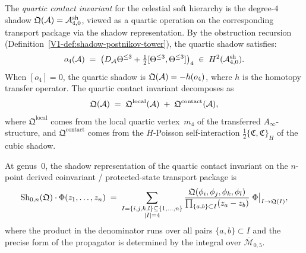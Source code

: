 \begin{definition}
The \emph{quartic contact invariant} for the celestial soft
hierarchy is the degree-$4$ shadow
$\mathfrak{Q}(\mathcal{A}) = \mathcal{A}^{\mathrm{sh}}_{4,0}$, viewed as a
quartic operation on the corresponding transport package via the shadow
representation. By the obstruction recursion
(Definition~\ref{V1-def:shadow-postnikov-tower}), the quartic
shadow satisfies:
\begin{equation}%
o_4(\cA)
\;=\;
\bigl(D_\cA\Theta^{\leq 3} + \tfrac{1}{2}
[\Theta^{\leq 3}, \Theta^{\leq 3}]\bigr)_4
\;\in\;
H^2(\cA^{\mathrm{sh}}_{4,0}).
\end{equation}
When $[o_4] = 0$, the quartic shadow is
$\mathfrak{Q}(\mathcal{A}) = -h(o_4)$, where $h$ is the homotopy transfer
operator. The quartic contact invariant decomposes as
\begin{equation}%
\mathfrak{Q}(\cA)
\;=\;
\mathfrak{Q}^{\mathrm{local}}(\cA)
\;+\;
\mathfrak{Q}^{\mathrm{contact}}(\cA),
\end{equation}
where $\mathfrak{Q}^{\mathrm{local}}$ comes from the local
quartic vertex~$m_4$ of the transferred $A_\infty$-structure, and
$\mathfrak{Q}^{\mathrm{contact}}$ comes from the
$H$-Poisson self-interaction
$\tfrac{1}{2}\{\mathfrak{C}, \mathfrak{C}\}_H$ of the cubic shadow.
\end{definition}

\begin{proposition}
At genus~$0$, the shadow representation of the quartic contact
invariant on the $n$-point derived coinvariant / protected-state
transport package is
\begin{equation}%
\Sh_{0,n}(\mathfrak{Q}) \cdot \Phi(z_1, \dotsc, z_n)
\;=\;
\sum_{\substack{I = \{i,j,k,l\} \subseteq \{1,\dotsc,n\} \\
 |I| = 4}}
\frac{\mathfrak{Q}(\phi_i, \phi_j, \phi_k, \phi_l)}
 {\prod_{\{a,b\} \subset I} (z_a - z_b)}\;
\Phi\bigl|_{I \to \mathfrak{Q}(I)},
\end{equation}
where the product in the denominator runs over all pairs
$\{a,b\} \subset I$ and the precise form of the propagator is
determined by the integral over $\overline{\mathcal{M}}_{0,5}$.
\end{proposition}

